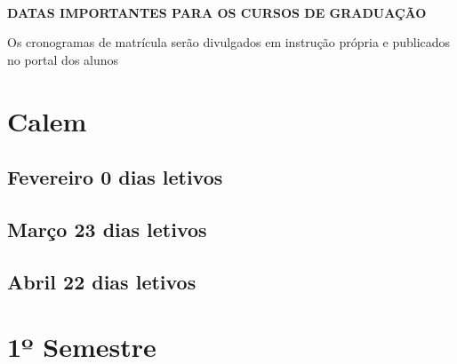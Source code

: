 \documentclass[thesis]{hmcposter}
\begin{document}
\begin{poster}
\vfill
\null
\columnbreak
~
\vfill
\begin{center}
\large \textbf{DATAS IMPORTANTES PARA OS CURSOS DE GRADUAÇÃO}
\newline
\null
\newline
\begin{table}
\centering
{}
\end{table}
\newline
\null
\newline
Os cronogramas de matrícula serão divulgados em instrução própria e publicados no portal dos alunos
\end{center}
\vfill
\null
\newpage\section{\color{hmcorange}Calem}\subsection{Fevereiro \hfill 0 dias letivos}\subsection{Março \hfill 23 dias letivos}\subsection{Abril \hfill 22 dias letivos}\vfill\null
\columnbreak
\section{\hfill \color{hmcorange}1º Semestre}

\end{poster}
\end{document}
